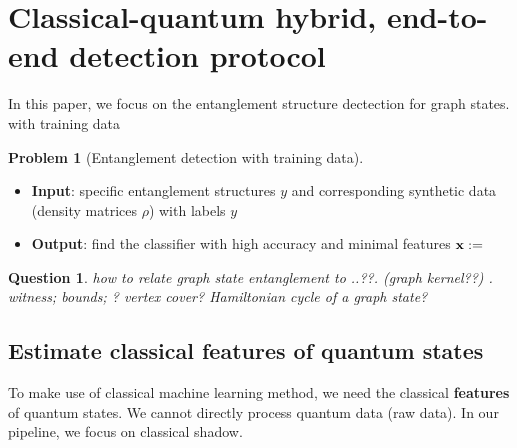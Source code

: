 \documentclass[
aps,
pra,
floatfix,
]{revtex4-2}
\theoremstyle{plain}
\newtheorem{question}{Question}
\theoremstyle{definition}
\newtheorem{problem}{Problem}
\newcommand{\dm}{\rho}
\begin{document}
\section{Classical-quantum hybrid, end-to-end detection protocol}


In this paper, we focus on the entanglement structure dectection for graph states.
with training data
\begin{problem}[Entanglement detection with training data]
	\begin{itemize}
		\item \textbf{Input}: specific entanglement structures $y$ and corresponding synthetic data (density matrices $\dm$) with labels $y$
		\item \textbf{Output}: find the classifier with high accuracy and minimal features $\vb{x}:=$
	\end{itemize}
\end{problem}
\begin{question}
	how to relate graph state entanglement to 
	..??. (graph kernel??)
	\cite{heinEntanglementGraphStates2006}.
	witness; bounds; ? vertex cover?
	Hamiltonian cycle of a graph state? 
\end{question} 


\subsection{Estimate classical features of quantum states}
To make use of classical machine learning method, we need the classical \textbf{features} of quantum states.
We cannot directly process quantum data (raw data).
In our pipeline, we focus on classical shadow.
\end{document}

